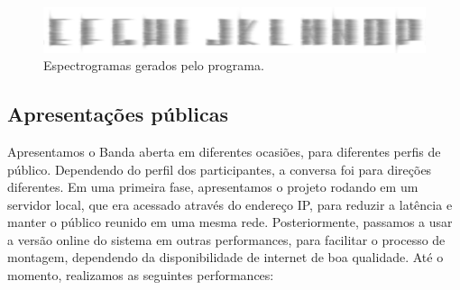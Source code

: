 \begin{figure}
    
        \includegraphics[width=1\textwidth]{pictures/spectrogram}
        \vspace{-10pt}
    \caption{Espectrogramas gerados pelo programa.}
    \vspace{-10pt}
    \label{fig:spectro}
\end{figure}







\subsection{Apresentações públicas}
Apresentamos o Banda aberta em diferentes ocasiões, para diferentes perfis de público. Dependendo do perfil dos participantes, a conversa foi para direções diferentes. Em uma primeira fase, apresentamos o projeto rodando em um servidor local, que era acessado através do endereço IP, para reduzir a latência e manter o público reunido em uma mesma rede. Posteriormente, passamos a usar a versão online do sistema em outras performances, para facilitar o processo de montagem, dependendo da disponibilidade de internet de boa qualidade. Até o momento, realizamos as seguintes performances:

